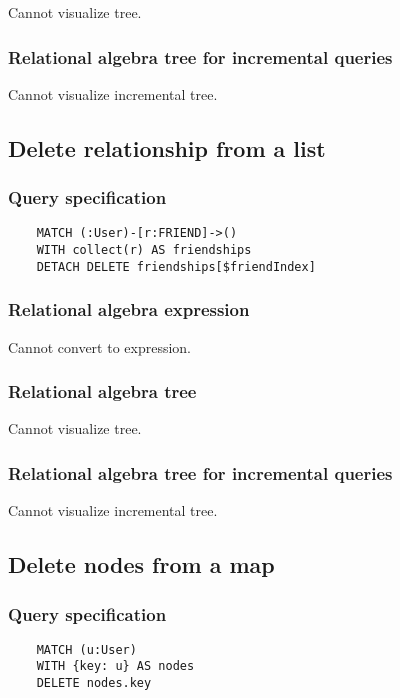 	Cannot visualize tree.

	\subsubsection*{Relational algebra tree for incremental queries}

	Cannot visualize incremental tree.
	\subsection{Delete relationship from a list}

	\subsubsection*{Query specification}

	\begin{lstlisting}
	MATCH (:User)-[r:FRIEND]->()
	WITH collect(r) AS friendships
	DETACH DELETE friendships[$friendIndex]
	\end{lstlisting}


	\subsubsection*{Relational algebra expression}

	Cannot convert to expression.

	\subsubsection*{Relational algebra tree}

	Cannot visualize tree.

	\subsubsection*{Relational algebra tree for incremental queries}

	Cannot visualize incremental tree.
	\subsection{Delete nodes from a map}

	\subsubsection*{Query specification}

	\begin{lstlisting}
	MATCH (u:User)
	WITH {key: u} AS nodes
	DELETE nodes.key
	\end{lstlisting}


